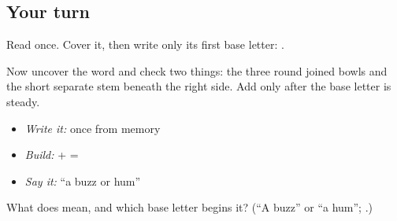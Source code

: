 \subsection*{Your turn}
Read \textbf{} once. Cover it, then write only its first base letter: \textbf{}.

Now uncover the word and check two things: the three round joined bowls and the short separate stem beneath the right side. Add \textbf{} only after the base letter is steady.

\begin{itemize}
\raggedright
  \item \emph{Write it:} \textbf{} once from memory
  \item \emph{Build:} \textbf{} + \textbf{} = \textbf{}
  \item \emph{Say it:} “a buzz or hum”
\end{itemize}

\begin{tcolorbox}[breakable,colback=teal!4,colframe=teal!35!black,title={Before you move on}]
What does \textbf{} mean, and which base letter begins it? (\textquotedblleft{}A buzz\textquotedblright{} or \textquotedblleft{}a hum\textquotedblright{}; \textbf{}.)
\end{tcolorbox}
